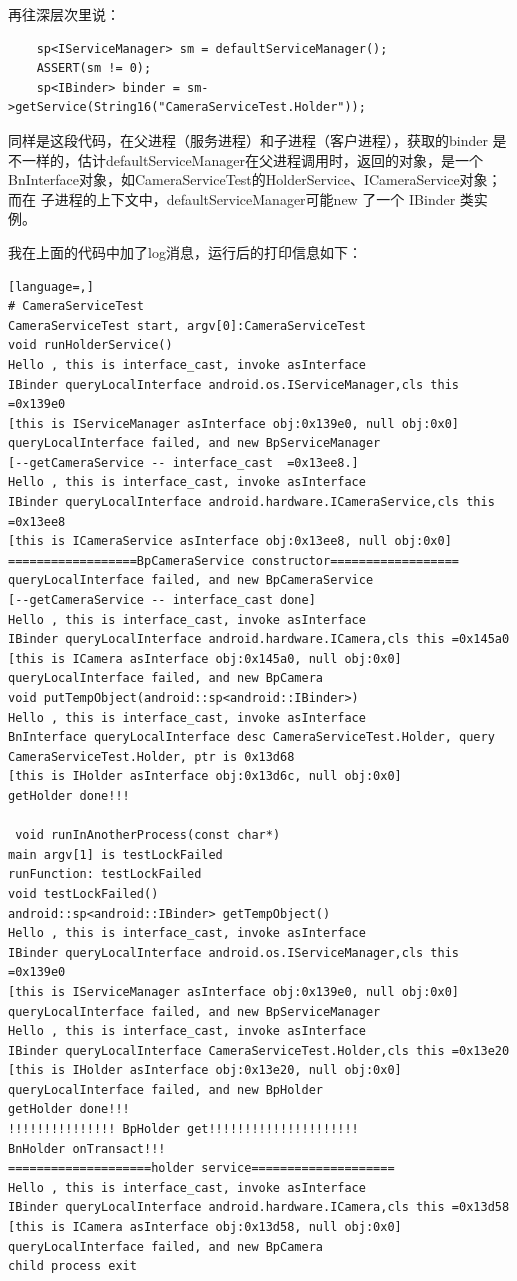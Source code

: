 \documentclass[a4paper,11pt]{article}
\begin{document}
\begin{appendices}
再往深层次里说：
\begin{lstlisting}
    sp<IServiceManager> sm = defaultServiceManager();
    ASSERT(sm != 0);
    sp<IBinder> binder = sm->getService(String16("CameraServiceTest.Holder"));
\end{lstlisting}
同样是这段代码，在父进程（服务进程）和子进程（客户进程），获取的binder
是不一样的，估计defaultServiceManager在父进程调用时，返回的对象，是一个
BnInterface对象，如CameraServiceTest的HolderService、ICameraService对象；而在
子进程的上下文中，defaultServiceManager可能new 了一个 IBinder 类实例。

我在上面的代码中加了log消息，运行后的打印信息如下：

\begin{lstlisting}[language=,]
# CameraServiceTest
CameraServiceTest start, argv[0]:CameraServiceTest
void runHolderService()
Hello , this is interface_cast, invoke asInterface
IBinder queryLocalInterface android.os.IServiceManager,cls this =0x139e0
[this is IServiceManager asInterface obj:0x139e0, null obj:0x0]
queryLocalInterface failed, and new BpServiceManager
[--getCameraService -- interface_cast  =0x13ee8.]
Hello , this is interface_cast, invoke asInterface
IBinder queryLocalInterface android.hardware.ICameraService,cls this =0x13ee8
[this is ICameraService asInterface obj:0x13ee8, null obj:0x0]
==================BpCameraService constructor==================
queryLocalInterface failed, and new BpCameraService
[--getCameraService -- interface_cast done]
Hello , this is interface_cast, invoke asInterface
IBinder queryLocalInterface android.hardware.ICamera,cls this =0x145a0
[this is ICamera asInterface obj:0x145a0, null obj:0x0]
queryLocalInterface failed, and new BpCamera
void putTempObject(android::sp<android::IBinder>)
Hello , this is interface_cast, invoke asInterface
BnInterface queryLocalInterface desc CameraServiceTest.Holder, query CameraServiceTest.Holder, ptr is 0x13d68
[this is IHolder asInterface obj:0x13d6c, null obj:0x0]
getHolder done!!!

 void runInAnotherProcess(const char*)
main argv[1] is testLockFailed
runFunction: testLockFailed
void testLockFailed()
android::sp<android::IBinder> getTempObject()
Hello , this is interface_cast, invoke asInterface
IBinder queryLocalInterface android.os.IServiceManager,cls this =0x139e0
[this is IServiceManager asInterface obj:0x139e0, null obj:0x0]
queryLocalInterface failed, and new BpServiceManager
Hello , this is interface_cast, invoke asInterface
IBinder queryLocalInterface CameraServiceTest.Holder,cls this =0x13e20
[this is IHolder asInterface obj:0x13e20, null obj:0x0]
queryLocalInterface failed, and new BpHolder
getHolder done!!!
!!!!!!!!!!!!!!! BpHolder get!!!!!!!!!!!!!!!!!!!!!
BnHolder onTransact!!!
====================holder service====================
Hello , this is interface_cast, invoke asInterface
IBinder queryLocalInterface android.hardware.ICamera,cls this =0x13d58
[this is ICamera asInterface obj:0x13d58, null obj:0x0]
queryLocalInterface failed, and new BpCamera
child process exit



\end{lstlisting}
\end{appendices}
\end{document}
